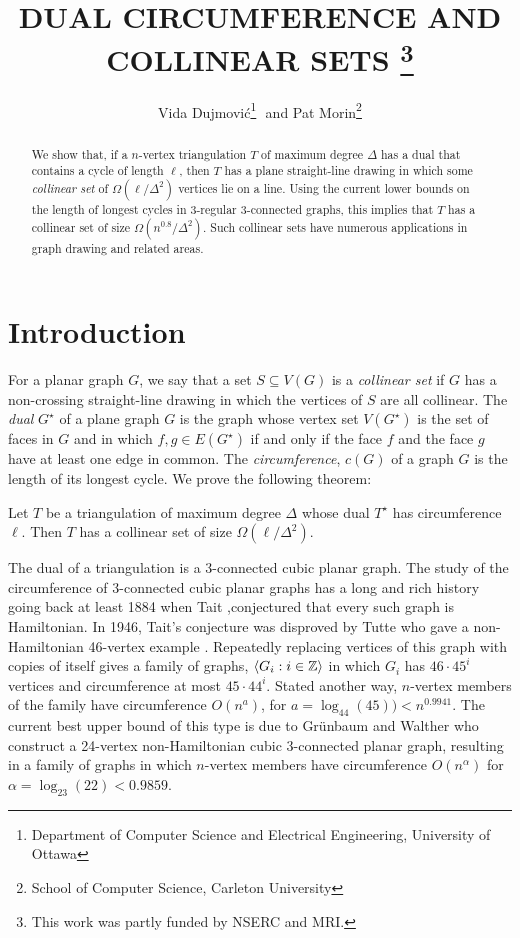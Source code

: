 \documentclass{patmorin}
\title{\MakeUppercase{Dual Circumference and Collinear Sets}%
    \thanks{This work was partly funded by NSERC and MRI.}}
\author{Vida Dujmovi\'c\thanks{Department of Computer Science and Electrical Engineering, University of Ottawa}\,\, and 
        Pat Morin\thanks{School of Computer Science, Carleton University}}
\newcommand{\dual}[1]{{#1}^\star}
\begin{document}
\maketitle


\begin{abstract}
   We show that, if a $n$-vertex triangulation $T$ of maximum degree
   $\Delta$ has a dual that contains a cycle of length $\ell$, then
   $T$ has a plane straight-line drawing in which some \emph{collinear
   set} of $\Omega(\ell/\Delta^2)$ vertices lie on a line.  Using the
   current lower bounds on the length of longest cycles in 3-regular
   3-connected graphs, this implies that $T$ has a collinear set of
   size $\Omega(n^{0.8}/\Delta^2)$.  Such collinear sets have numerous
   applications in graph drawing and related areas.
\end{abstract}

\section{Introduction}

For a planar graph $G$, we say that a set $S\subseteq V(G)$ is
a \emph{collinear set} if $G$ has a non-crossing straight-line drawing in
which the vertices of $S$ are all collinear.  The \emph{dual} $\dual{G}$
of a plane graph $G$ is the graph whose vertex set $V(\dual{G})$ is
the set of faces in $G$ and in which $f,g\in E(\dual{G})$ if and only
if the face $f$ and the face $g$ have at least one edge in common.
The \emph{circumference}, $c(G)$ of a graph $G$ is the length of its
longest cycle. We prove the following theorem:

\begin{thm}
  Let $T$ be a triangulation of maximum degree $\Delta$ whose dual
  $\dual{T}$ has circumference $\ell$. Then $T$ has a collinear set of
  size $\Omega(\ell/\Delta^2)$.
\end{thm}

The dual of a triangulation is a 3-connected cubic planar graph.
The study of the circumference of 3-connected cubic planar graphs
has a long and rich history going back at least 1884 when Tait
\cite{tait:listings},conjectured that every such graph is Hamiltonian.  In
1946, Tait's conjecture was disproved by Tutte who gave a non-Hamiltonian
46-vertex example \cite{tutte:on}.  Repeatedly replacing vertices of
this graph with copies of itself gives a family of graphs, $\langle G_i:i\in
\mathbb{Z}\rangle$ in which $G_i$ has $46\cdot 45^i$ vertices and circumference at
most $45\cdot44^i$.  Stated another way, $n$-vertex members of the
family have circumference $O(n^a)$, for $a=\log_{44}(45)) < n^{0.9941}$.
The current best upper bound of this type is due to Gr\"unbaum and
Walther \cite{grunbaum.walther:shortness} who construct a 24-vertex
non-Hamiltonian cubic 3-connected planar graph, resulting in a family
of graphs in which $n$-vertex members have circumference $O(n^{\alpha})$
for $\alpha=\log_{23}(22)< 0.9859$.
\end{document}
